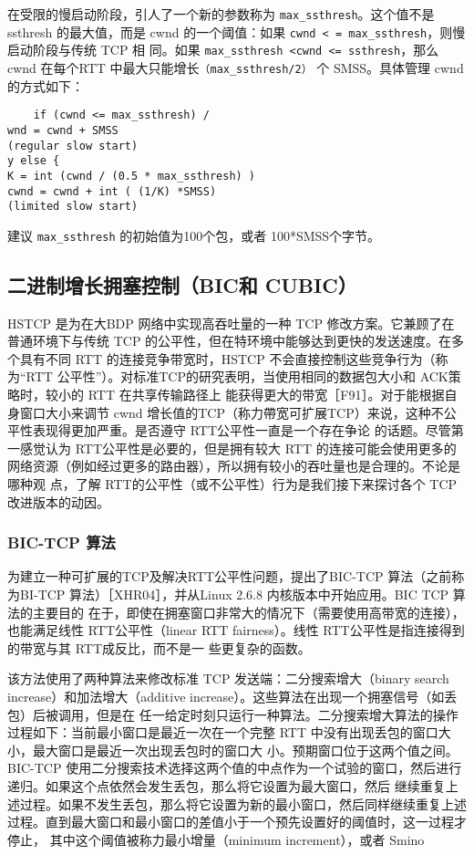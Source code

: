 在受限的慢启动阶段，引人了一个新的参数称为 \verb|max_ssthresh|。这个值不是 ssthresh 的最大值，而是 cwnd 的一个阈值：如果 \verb|cwnd < = max_ssthresh|，则慢启动阶段与传统 TCP 相
同。如果 \verb|max_ssthresh <cwnd <= ssthresh|，那么 cwnd 在每个RTT 中最大只能增长\verb|（max_ssthresh/2）| 个 SMSS。具体管理 cwnd的方式如下：
\begin{verbatim}
    if (cwnd <= max_ssthresh) /
wnd = cwnd + SMSS
(regular slow start)
y else {
K = int (cwnd / (0.5 * max_ssthresh) )
cwnd = cwnd + int ( (1/K) *SMSS)
(limited slow start)
\end{verbatim}
建议 \verb|max_ssthresh| 的初始值为100个包，或者 100*SMSS个字节。

\subsection{二进制增长拥塞控制（BIC和 CUBIC）}
HSTCP 是为在大BDP 网络中实现高吞吐量的一种 TCP 修改方案。它兼顾了在普通环境下与传统 TCP 的公平性，但在特环境中能够达到更快的发送速度。在多个具有不同 RTT
的连接竞争带宽时，HSTCP 不会直接控制这些竞争行为（称为“RTT 公平性”）。对标准TCP的研究表明，当使用相同的数据包大小和 ACK策略时，较小的 RTT 在共享传输路径上
能获得更大的带宽［F91］。对于能根据自身窗口大小来调节 cwnd 增长值的TCP（称力帶宽可扩展TCP）来说，这种不公平性表现得更加严重。是否遵守 RTT公平性一直是一个存在争论
的话题。尽管第一感觉认为 RTT公平性是必要的，但是拥有较大 RTT 的连接可能会使用更多的网络资源（例如经过更多的路由器），所以拥有较小的吞吐量也是合理的。不论是哪种观
点，了解 RTT的公平性（或不公平性）行为是我们接下来探讨各个 TCP改进版本的动因。

\subsubsection{BIC-TCP 算法}
为建立一种可扩展的TCP及解决RTT公平性问题，提出了BIC-TCP 算法（之前称为BI-TCP 算法）［XHR04］，并从Linux 2.6.8 内核版本中开始应用。BIC TCP 算法的主要目的
在于，即使在拥塞窗口非常大的情况下（需要使用高带宽的连接），也能满足线性 RTT公平性（linear RTT fairness）。线性 RTT公平性是指连接得到的带宽与其 RTT成反比，而不是一
些更复杂的函数。

该方法使用了两种算法来修改标准 TCP 发送端：二分搜索增大（binary search increase）和加法增大（additive increase）。这些算法在出现一个拥塞信号（如丢包）后被调用，但是在
任一给定时刻只运行一种算法。二分搜索增大算法的操作过程如下：当前最小窗口是最近一次在一个完整 RTT 中没有出现丢包的窗口大小，最大窗口是最近一次出现丢包时的窗口大
小。预期窗口位于这两个值之间。BIC-TCP 使用二分搜索技术选择这两个值的中点作为一个试验的窗口，然后进行递归。如果这个点依然会发生丢包，那么将它设置为最大窗口，然后
继续重复上述过程。如果不发生丢包，那么将它设置为新的最小窗口，然后同样继续重复上述过程。直到最大窗口和最小窗口的差值小于一个预先设置好的阈值时，这一过程才停止，
其中这个阈值被称力最小增量（minimum increment），或者 Smino

